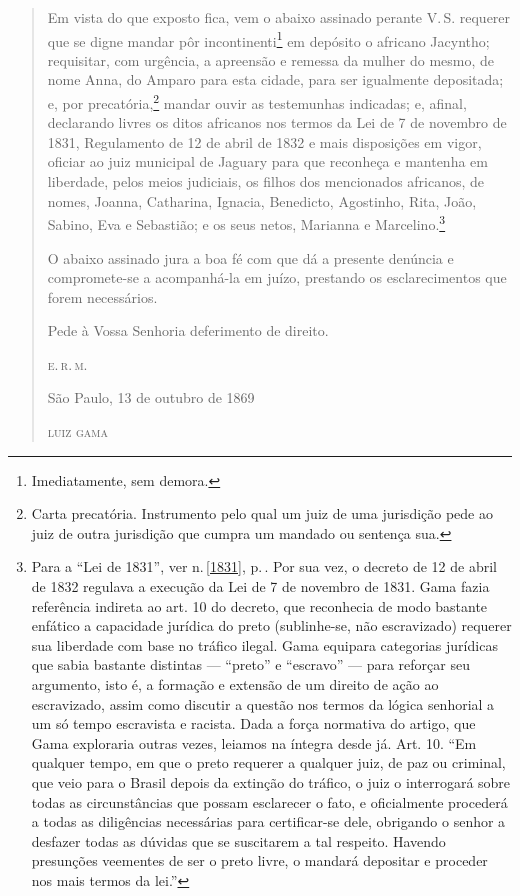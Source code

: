 \begin{quote}
Em vista do que exposto fica, vem o abaixo assinado perante V.\,S.
requerer que se digne mandar pôr incontinenti\footnote{Imediatamente,
  sem demora.} em depósito o africano Jacyntho; requisitar, com
urgência, a apreensão e remessa da mulher do mesmo, de nome Anna, do
Amparo para esta cidade, para ser igualmente depositada; e, por
precatória,\footnote{Carta precatória. Instrumento pelo qual um juiz de
  uma jurisdição pede ao juiz de outra jurisdição que cumpra um mandado
  ou sentença sua.} mandar ouvir as testemunhas indicadas; e, afinal,
declarando livres os ditos africanos nos termos da Lei de 7 de novembro
de 1831, Regulamento de 12 de abril de 1832 e mais disposições em vigor,
oficiar ao juiz municipal de Jaguary para que reconheça e mantenha em
liberdade, pelos meios judiciais, os filhos dos mencionados africanos,
de nomes, Joanna, Catharina, Ignacia, Benedicto, Agostinho, Rita, João,
Sabino, Eva e Sebastião; e os seus netos, Marianna e
Marcelino.\footnote{Para a ``Lei de
  1831'', ver n.\,\ref{1831}, p.\,\pageref{1831}. Por sua
  vez, o decreto de 12 de abril de 1832 regulava a execução da Lei de 7 de
  novembro de 1831. Gama fazia referência indireta ao art. 10 do
  decreto, que reconhecia de modo bastante enfático a capacidade
  jurídica do preto (sublinhe-se, não escravizado) requerer sua
  liberdade com base no tráfico ilegal. Gama equipara categorias
  jurídicas que sabia bastante distintas --- ``preto'' e ``escravo'' --- para
  reforçar seu argumento, isto é, a formação e extensão de um direito de
  ação ao escravizado, assim como discutir a questão nos termos da
  lógica senhorial a um só tempo escravista e racista. Dada a força
  normativa do artigo, que Gama exploraria outras vezes, leiamos na
  íntegra desde já. Art. 10. ``Em qualquer tempo, em que o preto requerer
  a qualquer juiz, de paz ou criminal, que veio para o Brasil depois da
  extinção do tráfico, o juiz o interrogará sobre todas as
  circunstâncias que possam esclarecer o fato, e oficialmente procederá
  a todas as diligências necessárias para certificar-se dele, obrigando
  o senhor a desfazer todas as dúvidas que se suscitarem a tal respeito.
  Havendo presunções veementes de ser o preto livre, o mandará depositar
  e proceder nos mais termos da lei.''\label{ingles}}

O abaixo assinado jura a boa fé com que dá a presente denúncia e
compromete-se a acompanhá-la em juízo, prestando os esclarecimentos que
forem necessários.

\begin{flushright}
Pede à Vossa Senhoria deferimento de direito.

\textsc{e.\,r.\,m.}

São Paulo, 13 de outubro de 1869

\textsc{luiz gama}
\end{flushright}
\end{quote}


